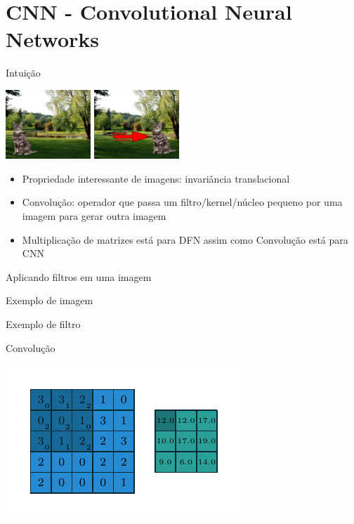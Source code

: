 \documentclass[10pt]{beamer}
\begin{document}
\section{CNN - Convolutional Neural Networks}

\begin{frame}{Intuição}
	\begin{center}
	\includegraphics[width=0.24\textwidth]{images/trans_invariance0.png}
    \hspace{0.12\textwidth}
    \includegraphics[width=0.24\textwidth]{images/trans_invariance1.png}
    \end{center}
\begin{itemize}
	\item Propriedade interessante de imagens: invariância translacional
    \item Convolução: operador que passa um filtro/kernel/núcleo pequeno por uma imagem para gerar outra imagem
    \item Multiplicação de matrizes está para DFN assim como Convolução está para CNN
\end{itemize}
\end{frame}


\begin{frame}{Aplicando filtros em uma imagem}

\end{frame}


\begin{frame}{Exemplo de imagem}

\end{frame}

\begin{frame}{Exemplo de filtro}

\end{frame}


\begin{frame}{Convolução}
\begin{center}
\includegraphics[scale=1.5]{images/numerical_no_padding_no_strides_00.pdf}
\end{center}
\end{frame}
\end{document}
